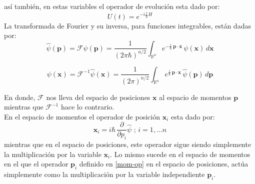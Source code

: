 \documentclass[12pt]{book}
\numberwithin{equation}{chapter}
\def\R{\mathbb{R}}
\def\F{\mathcal{F}}
\def\x{\mathbf{x}}
\def\P{\mathbf{p}}
\begin{document}
as\'i tambi\'en, en estas variables el operador de evoluci\'on esta dado por:
$$ U(t)= e^{-i \frac{t}{\hbar}H} $$ 
La transformada de Fourier y su inversa, para funciones integrables, est\'an dadas por:
$$ \hat{\psi}(\P) = \F\psi(\P)=\frac{1}{(2\pi \hbar)^{n/2}} \int_{\R^{n}} e^{-\frac{i}{\hbar}\,\P \cdot \x } \, \psi(\x)\, d\x $$

$$ \psi(\x) =  \F^{-1}\hat{\psi}(\x) =\frac{1}{(2\pi)^{n/2}} \int_{\R^{n}} e^{\frac{i}{\hbar}\,\P \cdot \x} \, \hat{\psi}(\P)\, d\P $$

En donde, $\F$ nos lleva del espacio de posiciones $\x$ al espacio de momentos $\P$ mientras que $\F^{-1}$ hace lo contrario.\\
En el espacio de momentos el operador de posici\'on $\x_{i}$ esta dado por:
\begin{equation}\label{pos-op}
\x_{i} = i\hbar \, \frac{\partial}{\partial p_{i}} \hat{\psi} \,\,;\, i=1,\ldots n
\end{equation}
mientras que en el espacio de posiciones, este operador sigue siendo simplemente la multiplicaci\'on por la variable $\x_{i}$. Lo mismo sucede en el espacio de momentos en el que el operador $\P_{i}$ definido en \eqref{mom-op} en el espacio de posiciones, act\'ua simplemente como la multiplicaci\'on por la variable independiente $\P_{i}$.
\end{document}
